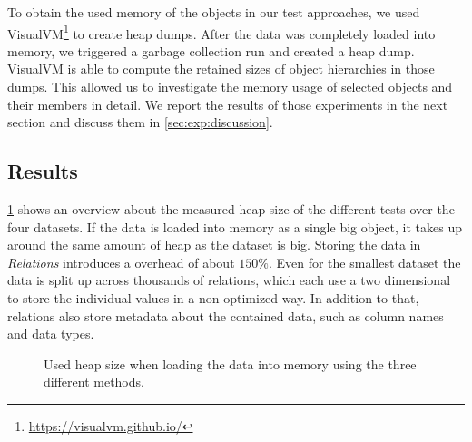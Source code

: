   To obtain the used memory of the objects in our test approaches, we used VisualVM\footnote{\url{https://visualvm.github.io/}} to create heap dumps.
  After the data was completely loaded into memory, we triggered a garbage collection run and created a heap dump.
  VisualVM is able to compute the retained sizes of object hierarchies in those dumps.
  This allowed us to investigate the memory usage of selected objects and their members in detail.
  We report the results of those experiments in the next section and discuss them in \cref{sec:exp:discussion}.

\subsection{Results}

  \cref{fig:exp:general} shows an overview about the measured heap size of the different tests over the four datasets.
  If the data is loaded into memory as a single big  object, it takes up around the same amount of heap as the dataset is big.
  Storing the data in \textit{Relations} introduces a overhead of about $150 \%$.
  Even for the smallest dataset the data is split up across thousands of relations, which each use a two dimensional  to store the individual values in a non-optimized way.
  In addition to that, relations also store metadata about the contained data, such as column names and data types.
  
  \begin{figure}
    \centering
    \caption{Used heap size when loading the data into memory using the three different methods.}
    \label{fig:exp:general}
  \end{figure}

